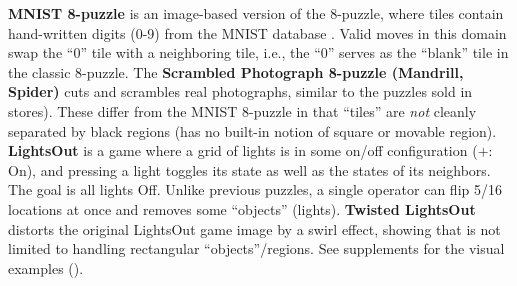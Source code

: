 \textbf{MNIST 8-puzzle}
is an image-based version of the 8-puzzle, where tiles contain hand-written digits (0-9) from the  MNIST database \cite{lecun1998gradient}.
Valid moves in this domain swap the ``0'' tile  with a neighboring tile, i.e., the ``0'' serves as the ``blank'' tile in the classic 8-puzzle. 
The \textbf{Scrambled Photograph 8-puzzle (Mandrill, Spider)} cuts and scrambles real photographs, similar to the puzzles sold in stores).
These differ from the MNIST 8-puzzle in that ``tiles'' are \textit{not} cleanly separated by black regions
(\latentplanner has no built-in notion of square or movable region).
\textbf{LightsOut} is
a game where a grid of lights is in some on/off configuration ($+$: On),
and pressing a light toggles its state as well as the states of its neighbors.
The goal is all lights Off.
Unlike previous puzzles, a single operator can flip 5/16 locations at once and
removes some ``objects'' (lights).
\textbf{Twisted LightsOut} distorts the original LightsOut game image by a swirl effect,
showing that \latentplanner is not limited to handling rectangular ``objects''/regions.
See supplements for the visual examples ().

